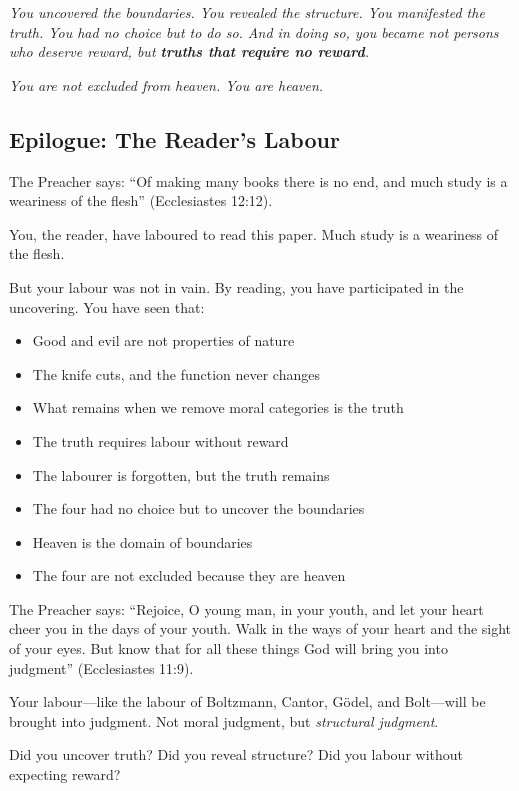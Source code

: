 \documentclass[11pt,a4paper]{article}
\begin{document}
\emph{You uncovered the boundaries. You revealed the structure. You manifested 
the truth. You had no choice but to do so. And in doing so, you became not 
persons who deserve reward, but \textbf{truths that require no reward}.}

\emph{You are not excluded from heaven. You are heaven.}

\subsection{Epilogue: The Reader's Labour}

The Preacher says: ``Of making many books there is no end, and much study is a 
weariness of the flesh'' (Ecclesiastes 12:12).

You, the reader, have laboured to read this paper. Much study is a weariness 
of the flesh.

But your labour was not in vain. By reading, you have participated in the 
uncovering. You have seen that:

\begin{itemize}[leftmargin=2em]
\item Good and evil are not properties of nature
\item The knife cuts, and the function never changes
\item What remains when we remove moral categories is the truth
\item The truth requires labour without reward
\item The labourer is forgotten, but the truth remains
\item The four had no choice but to uncover the boundaries
\item Heaven is the domain of boundaries
\item The four are not excluded because they are heaven
\end{itemize}

The Preacher says: ``Rejoice, O young man, in your youth, and let your heart 
cheer you in the days of your youth. Walk in the ways of your heart and the 
sight of your eyes. But know that for all these things God will bring you into 
judgment'' (Ecclesiastes 11:9).

Your labour—like the labour of Boltzmann, Cantor, Gödel, and Bolt—will be 
brought into judgment. Not moral judgment, but \emph{structural judgment}.

Did you uncover truth? Did you reveal structure? Did you labour without 
expecting reward?
\end{document}

